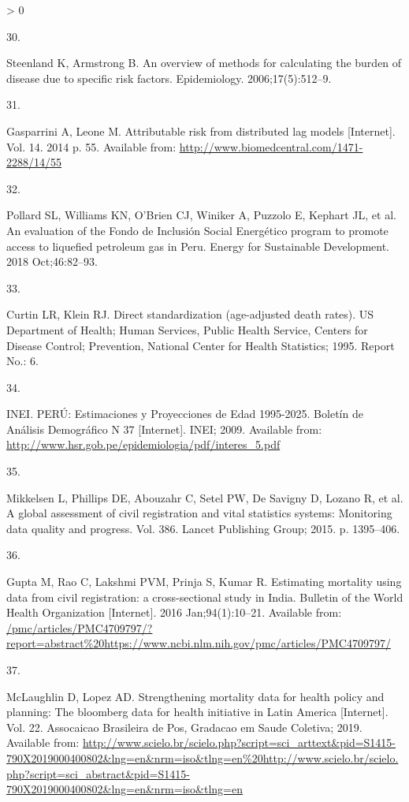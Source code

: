 \documentclass[
]{article}
\newlength{\cslhangindent}
\newlength{\csllabelwidth}
\newenvironment{CSLReferences}[2] %
 {%
  \setlength{\parindent}{0pt}
  \ifodd #1 \everypar{\setlength{\hangindent}{\cslhangindent}}\ignorespaces\fi
  \ifnum #2 > 0
  \setlength{\parskip}{#2\baselineskip}
  \fi
 }%
 {}
\newcommand{\CSLLeftMargin}[1]{\parbox[t]{\csllabelwidth}{#1}}
\newcommand{\CSLRightInline}[1]{\parbox[t]{\linewidth - \csllabelwidth}{#1}\break}
\begin{document}
\begin{CSLReferences}{0}{0}
\leavevmode\hypertarget{ref-Steenland2006}{}%
\CSLLeftMargin{30. }
\CSLRightInline{Steenland K, Armstrong B. {An overview of methods for calculating the burden of disease due to specific risk factors}. Epidemiology. 2006;17(5):512--9. }

\leavevmode\hypertarget{ref-Gasparrini2014}{}%
\CSLLeftMargin{31. }
\CSLRightInline{Gasparrini A, Leone M. {Attributable risk from distributed lag models} {[}Internet{]}. Vol. 14. 2014 p. 55. Available from: \url{http://www.biomedcentral.com/1471-2288/14/55}}

\leavevmode\hypertarget{ref-Pollard2018}{}%
\CSLLeftMargin{32. }
\CSLRightInline{Pollard SL, Williams KN, O'Brien CJ, Winiker A, Puzzolo E, Kephart JL, et al. {An evaluation of the Fondo de Inclusi{ó}n Social Energ{é}tico program to promote access to liquefied petroleum gas in Peru}. Energy for Sustainable Development. 2018 Oct;46:82--93. }

\leavevmode\hypertarget{ref-Curtin1995}{}%
\CSLLeftMargin{33. }
\CSLRightInline{Curtin LR, Klein RJ. {Direct standardization (age-adjusted death rates)}. US Department of Health; Human Services, Public Health Service, Centers for Disease Control; Prevention, National Center for Health Statistics; 1995. Report No.: 6. }

\leavevmode\hypertarget{ref-INEI2009}{}%
\CSLLeftMargin{34. }
\CSLRightInline{INEI. {PER{Ú}: Estimaciones y Proyecciones de Edad 1995-2025. Bolet{í}n de An{á}lisis Demogr{á}fico N{{}} 37} {[}Internet{]}. INEI; 2009. Available from: \url{http://www.hsr.gob.pe/epidemiologia/pdf/interes_5.pdf}}

\leavevmode\hypertarget{ref-Mikkelsen2015}{}%
\CSLLeftMargin{35. }
\CSLRightInline{Mikkelsen L, Phillips DE, Abouzahr C, Setel PW, De Savigny D, Lozano R, et al. {A global assessment of civil registration and vital statistics systems: Monitoring data quality and progress}. Vol. 386. Lancet Publishing Group; 2015. p. 1395--406. }

\leavevmode\hypertarget{ref-Gupta2016}{}%
\CSLLeftMargin{36. }
\CSLRightInline{Gupta M, Rao C, Lakshmi PVM, Prinja S, Kumar R. {Estimating mortality using data from civil registration: a cross-sectional study in India}. Bulletin of the World Health Organization {[}Internet{]}. 2016 Jan;94(1):10--21. Available from: \url{/pmc/articles/PMC4709797/?report=abstract\%20https://www.ncbi.nlm.nih.gov/pmc/articles/PMC4709797/}}

\leavevmode\hypertarget{ref-McLaughlin2019}{}%
\CSLLeftMargin{37. }
\CSLRightInline{McLaughlin D, Lopez AD. {Strengthening mortality data for health policy and planning: The bloomberg data for health initiative in Latin America} {[}Internet{]}. Vol. 22. Assocaicao Brasileira de Pos, Gradacao em Saude Coletiva; 2019. Available from: \url{http://www.scielo.br/scielo.php?script=sci_arttext\&pid=S1415-790X2019000400802\&lng=en\&nrm=iso\&tlng=en\%20http://www.scielo.br/scielo.php?script=sci_abstract\&pid=S1415-790X2019000400802\&lng=en\&nrm=iso\&tlng=en}}


\end{CSLReferences}
\end{document}
